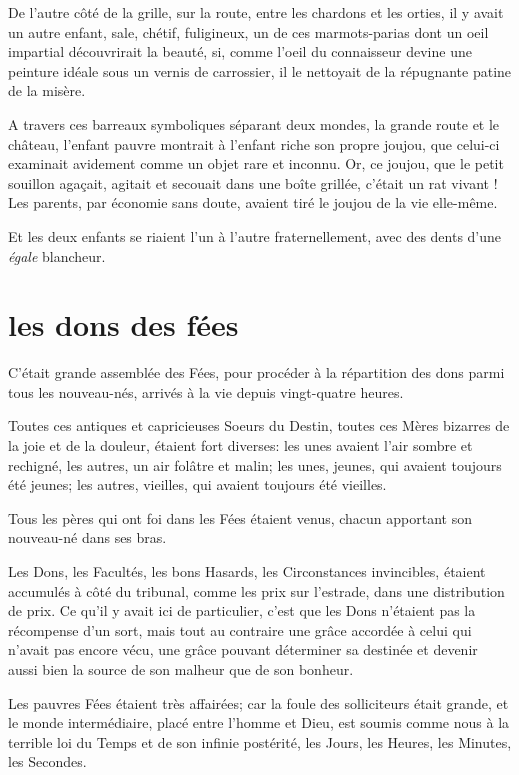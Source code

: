 De l’autre côté de la grille, sur la route, entre les
chardons et les orties, il y avait un autre enfant, sale, chétif,
fuligineux, un de ces marmots{}-parias dont un oeil impartial
découvrirait la beauté, si, comme l’oeil du
connaisseur devine une peinture idéale sous un vernis de carrossier, il
le nettoyait de la répugnante patine de la misère.

A travers ces barreaux symboliques séparant deux mondes, la grande route
et le château, l’enfant pauvre montrait à
l’enfant riche son propre joujou, que celui{}-ci
examinait avidement comme un objet rare et inconnu. Or, ce joujou, que
le petit souillon agaçait, agitait et secouait dans une boîte grillée,
c’était un rat vivant ! Les parents, par économie sans
doute, avaient tiré le joujou de la vie elle{}-même.

Et les deux enfants se riaient l’un à
l’autre fraternellement, avec des dents
d’une \textit{égale} blancheur.

\quebra\section[Les dons des fées]{les dons des fées}

C’était grande assemblée des Fées, pour procéder à la
répartition des dons parmi tous les nouveau{}-nés, arrivés à la vie
depuis vingt{}-quatre heures.

Toutes ces antiques et capricieuses Soeurs du Destin, toutes ces Mères
bizarres de la joie et de la douleur, étaient fort diverses: les unes
avaient l’air sombre et rechigné, les autres, un air
folâtre et malin; les unes, jeunes, qui avaient toujours été jeunes;
les autres, vieilles, qui avaient toujours été vieilles.

Tous les pères qui ont foi dans les Fées étaient venus, chacun apportant
son nouveau{}-né dans ses bras.

Les Dons, les Facultés, les bons Hasards, les Circonstances invincibles,
étaient accumulés à côté du tribunal, comme les prix sur
l’estrade, dans une distribution de prix. Ce
qu’il y avait ici de particulier,
c’est que les Dons n’étaient pas la
récompense d’un sort, mais tout au contraire une grâce
accordée à celui qui n’avait pas encore vécu, une
grâce pouvant déterminer sa destinée et devenir aussi bien la source de
son malheur que de son bonheur.

Les pauvres Fées étaient très affairées; car la foule des solliciteurs
était grande, et le monde intermédiaire, placé entre
l’homme et Dieu, est soumis comme nous à la terrible
loi du Temps et de son infinie postérité, les Jours, les Heures, les
Minutes, les Secondes.

